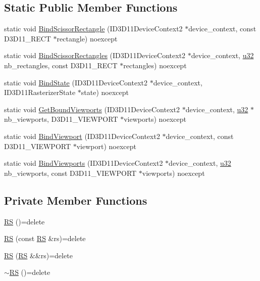 \subsection*{Static Public Member Functions}
\begin{DoxyCompactItemize}
\item 
static void \hyperlink{structmage_1_1_pipeline_1_1_r_s_a28be63e6e29c73316854301243d7064e}{Bind\+Scissor\+Rectangle} (I\+D3\+D11\+Device\+Context2 $\ast$device\+\_\+context, const D3\+D11\+\_\+\+R\+E\+CT $\ast$rectangle) noexcept
\item 
static void \hyperlink{structmage_1_1_pipeline_1_1_r_s_a314c42f225cbf4c6e72f22917165aef7}{Bind\+Scissor\+Rectangles} (I\+D3\+D11\+Device\+Context2 $\ast$device\+\_\+context, \hyperlink{namespacemage_af2b398bf98eb10351f49cad73fe2cc73}{u32} nb\+\_\+rectangles, const D3\+D11\+\_\+\+R\+E\+CT $\ast$rectangles) noexcept
\item 
static void \hyperlink{structmage_1_1_pipeline_1_1_r_s_a1bb922e09c6b1d11fa87a84379f0d91a}{Bind\+State} (I\+D3\+D11\+Device\+Context2 $\ast$device\+\_\+context, I\+D3\+D11\+Rasterizer\+State $\ast$state) noexcept
\item 
static void \hyperlink{structmage_1_1_pipeline_1_1_r_s_aedf0086a1c3dd602f32b4ca939e1483a}{Get\+Bound\+Viewports} (I\+D3\+D11\+Device\+Context2 $\ast$device\+\_\+context, \hyperlink{namespacemage_af2b398bf98eb10351f49cad73fe2cc73}{u32} $\ast$nb\+\_\+viewports, D3\+D11\+\_\+\+V\+I\+E\+W\+P\+O\+RT $\ast$viewports) noexcept
\item 
static void \hyperlink{structmage_1_1_pipeline_1_1_r_s_a925570347f6516c2c0d08f9262afec26}{Bind\+Viewport} (I\+D3\+D11\+Device\+Context2 $\ast$device\+\_\+context, const D3\+D11\+\_\+\+V\+I\+E\+W\+P\+O\+RT $\ast$viewport) noexcept
\item 
static void \hyperlink{structmage_1_1_pipeline_1_1_r_s_a79b090e17c34959da4f9b87b490601f5}{Bind\+Viewports} (I\+D3\+D11\+Device\+Context2 $\ast$device\+\_\+context, \hyperlink{namespacemage_af2b398bf98eb10351f49cad73fe2cc73}{u32} nb\+\_\+viewports, const D3\+D11\+\_\+\+V\+I\+E\+W\+P\+O\+RT $\ast$viewports) noexcept
\end{DoxyCompactItemize}
\subsection*{Private Member Functions}
\begin{DoxyCompactItemize}
\item 
\hyperlink{structmage_1_1_pipeline_1_1_r_s_a5d2920325973d503fee6137b45835503}{RS} ()=delete
\item 
\hyperlink{structmage_1_1_pipeline_1_1_r_s_a264dbb8473ad4a286112aa525e2a3018}{RS} (const \hyperlink{structmage_1_1_pipeline_1_1_r_s}{RS} \&rs)=delete
\item 
\hyperlink{structmage_1_1_pipeline_1_1_r_s_a5aca2e871b4a7133bb49b98f28a2ef9e}{RS} (\hyperlink{structmage_1_1_pipeline_1_1_r_s}{RS} \&\&rs)=delete
\item 
\hyperlink{structmage_1_1_pipeline_1_1_r_s_a3a6900db36fe13ce2ddd6375314d5bc6}{$\sim$\+RS} ()=delete
\end{DoxyCompactItemize}


